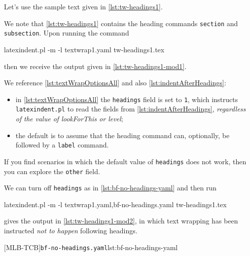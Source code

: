  \begin{example}
 Let's use the sample text given in \cref{lst:tw-headings1}. 


 We note that \cref{lst:tw-headings1} contains the heading commands \texttt{section} and
 \texttt{subsection}. Upon running the command

 \begin{commandshell}
latexindent.pl -m -l textwrap1.yaml tw-headings1.tex
\end{commandshell}

 then we receive the output given in \cref{lst:tw-headings1-mod1}.


 We reference \vref{lst:textWrapOptionsAll} and also \vref{lst:indentAfterHeadings}:
 \begin{itemize}
  \item in \cref{lst:textWrapOptionsAll} the \texttt{headings} field is set to
        \texttt{1}, which instructs \texttt{latexindent.pl} to read the fields from
        \vref{lst:indentAfterHeadings}, \emph{regardless of the value of lookForThis or
        level};
  \item the default is to assume that the heading command can, optionally, be followed by
        a \texttt{label} command.
 \end{itemize}
 If you find scenarios in which the default value of \texttt{headings} does not work,
 then you can explore the \texttt{other} field.

 We can turn off \texttt{headings} as in \cref{lst:bf-no-headings-yaml} and then run

 \begin{commandshell}
latexindent.pl -m -l textwrap1.yaml,bf-no-headings.yaml tw-headings1.tex
\end{commandshell}

 gives the output in \cref{lst:tw-headings1-mod2}, in which text wrapping has been
 instructed \emph{not to happen} following headings.
 \begin{cmhtcbraster}
  [MLB-TCB]{\texttt{bf-no-headings.yaml}}{lst:bf-no-headings-yaml}
 \end{cmhtcbraster}
 \end{example}

